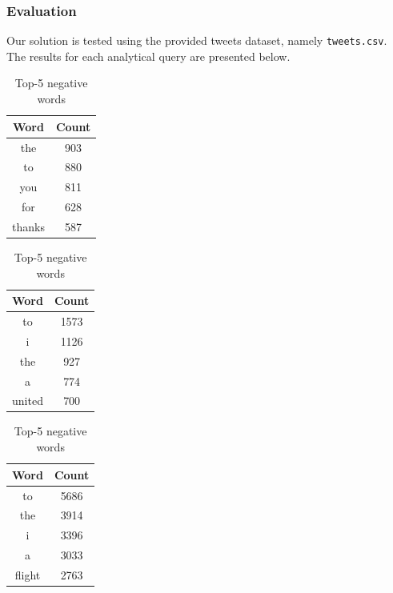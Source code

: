 \documentclass[acmlarge]{acmart}
\begin{document}
  \subsubsection{Evaluation} Our solution is tested using the provided tweets dataset, namely \texttt{tweets.csv}. The results for each analytical query are presented below.

  \begin{table}[h!]
    \centering
    \begin{minipage}{0.30\textwidth}
      \centering
      \begin{tabular}{|c|c|}
        \hline
        \textbf{Word} & \textbf{Count} \\ \hline
        the & 903 \\ \hline
        to & 880 \\ \hline
        you & 811 \\ \hline
        for & 628 \\ \hline
        thanks & 587 \\ \hline
      \end{tabular}
      \caption{Top-5 positive words}
    \end{minipage} \hspace{0.3cm}
    \begin{minipage}{0.30\textwidth}
      \centering
      \begin{tabular}{|c|c|}
        \hline
        \textbf{Word} & \textbf{Count} \\ \hline
        to & 1573 \\ \hline
        i & 1126 \\ \hline
        the & 927 \\ \hline
        a & 774 \\ \hline
        united & 700 \\ \hline
      \end{tabular}
      \caption{Top-5 neutral words}
    \end{minipage}
    \begin{minipage}{0.30\textwidth}
      \centering
      \begin{tabular}{|c|c|}
        \hline
        \textbf{Word} & \textbf{Count} \\ \hline
        to & 5686 \\ \hline
        the & 3914 \\ \hline
        i & 3396 \\ \hline
        a & 3033 \\ \hline
        flight &2763 \\ \hline
      \end{tabular}
      \caption{Top-5 negative words}
    \end{minipage}
  \end{table}
\end{document}
